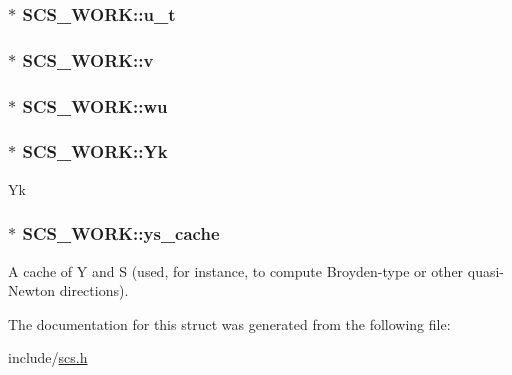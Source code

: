 \hypertarget{struct_s_c_s___w_o_r_k_a199e1e4e48020d89df08be36af7749eb}{
\subsubsection[{u\-\_\-t}]{$\ast$ S\-C\-S\-\_\-\-W\-O\-R\-K\-::u\-\_\-t}}\label{struct_s_c_s___w_o_r_k_a199e1e4e48020d89df08be36af7749eb}
\hypertarget{struct_s_c_s___w_o_r_k_a9549b72c9049c21af513af6c07aecf50}{
\subsubsection[{v}]{$\ast$ S\-C\-S\-\_\-\-W\-O\-R\-K\-::v}}\label{struct_s_c_s___w_o_r_k_a9549b72c9049c21af513af6c07aecf50}
\hypertarget{struct_s_c_s___w_o_r_k_a91d8b48b9f9cbc66223568bf8a5b09d4}{
\subsubsection[{wu}]{$\ast$ S\-C\-S\-\_\-\-W\-O\-R\-K\-::wu}}\label{struct_s_c_s___w_o_r_k_a91d8b48b9f9cbc66223568bf8a5b09d4}
\hypertarget{struct_s_c_s___w_o_r_k_a8fd4206b5c374331f6b0653209a0b1be}{
\subsubsection[{Yk}]{$\ast$ S\-C\-S\-\_\-\-W\-O\-R\-K\-::\-Yk}}\label{struct_s_c_s___w_o_r_k_a8fd4206b5c374331f6b0653209a0b1be}
Yk \hypertarget{struct_s_c_s___w_o_r_k_aa26ee7ef5b937334d46c3210ed4867ce}{
\subsubsection[{ys\-\_\-cache}]{$\ast$ S\-C\-S\-\_\-\-W\-O\-R\-K\-::ys\-\_\-cache}}\label{struct_s_c_s___w_o_r_k_aa26ee7ef5b937334d46c3210ed4867ce}
A cache of Y and S (used, for instance, to compute Broyden-\/type or other quasi-\/\-Newton directions). 

The documentation for this struct was generated from the following file\-:\begin{DoxyCompactItemize}
\item 
include/\hyperlink{scs_8h}{scs.\-h}\end{DoxyCompactItemize}
